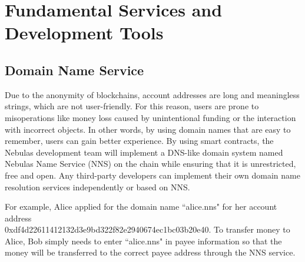 \section{Fundamental Services and Development Tools}
\label{sec:tools}

\subsection{Domain Name Service}

Due to the anonymity of blockchains, account addresses are long and meaningless strings, which are not user-friendly. For this reason, users are prone to misoperations like money loss caused by unintentional funding or the interaction with incorrect objects. In other words, by using domain names that are easy to remember, users can gain better experience. By using smart contracts, the Nebulas development team will implement a DNS-like domain system named Nebulas Name Service (NNS) on the chain while ensuring that it is unrestricted, free and open. Any third-party developers can implement their own domain name resolution services independently or based on NNS.


For example, Alice applied for the domain name ``alice.nns" for her account address \\0xdf4d22611412132d3e9bd322f82e2940674ec1bc03b20e40. To transfer money to Alice, Bob simply needs to enter ``alice.nns" in payee information so that the money will be transferred to the correct payee address through the NNS service.


